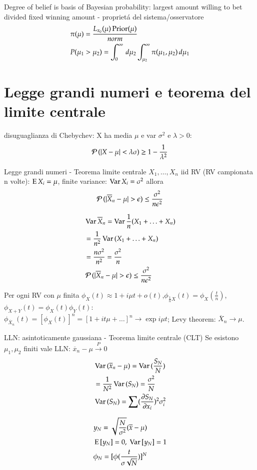 \documentclass[main.tex]{subfiles}
\begin{document}
Degree of belief is basis of Bayesian probability: largest amount willing to bet divided fixed winning amount - propriet\'a del sistema/osservatore
\begin{align*}
&\pi(\mu)=\frac{L_{x_0}(\mu)\prior(\mu)}{norm}\\
&P(\mu_1>\mu_2)=\int_0^{\infty}\,d\mu_2\int_{\mu_2}^{\infty}\pi(\mu_1,\mu_2)\,d\mu_1
\end{align*}

\chapter{Legge grandi numeri e teorema del limite centrale}

disuguaglianza di Chebychev: X ha media $\mu$ e var $\sigma^2$ e $\lambda>0$:
\[\prob{(|X-\mu|<\lambda\sigma)}\geq1-\frac{1}{\lambda^2}\]

Legge grandi numeri - Teorema limite centrale
$X_1,\ldots,X_n$ iid RV (RV campionata n volte): $\E{X_i}=\mu$, finite variance: $\var{X_i}=\sigma^2$ allora \[\prob{(|\overline{X}_n-\mu|>\epsilon)}\leq\frac{\sigma^2}{n\epsilon^2}\]

\begin{align*}
&\var{\overline{X}_n}=\var{\frac{1}{n}(X_1+\ldots+X_n)}\\
&=\frac{1}{n^2}\var{(X_1+\ldots+X_n)}\\
&=\frac{n\sigma^2}{n^2}=\frac{\sigma^2}{n}\\
&\prob{(|\overline{X}_n-\mu|>\epsilon)}\leq\frac{\sigma^2}{n\epsilon^2}
\end{align*}

Per ogni RV con $\mu$ finita $\phi_X(t)\approx1+i\mu t+o(t)$,$\phi_{\frac{1}{n}X}(t)=\phi_X(\frac{t}{n})$, $\phi_{X+Y}(t)=\phi_X(t)\phi_Y(t)$:
$\phi_{\overline{X}_n}(t)=[\phi_X(t)]^n=[1+it\mu+\ldots]^n\to\exp{i\mu t}$; Levy theorem: $\overline{X}_n\to\mu$.

LLN: asintoticamente gaussiana - Teorema limite centrale (CLT)
Se esistono $\mu_1, \mu_2$ finiti vale LLN: $\overline{x}_n-\mu\xrightarrow{P}0$
\begin{align*}
&\var{(\overline{x}_n-\mu)}=\var{(\frac{S_N}{N})}\\
&=\frac{1}{N^2}\var{(S_N)}=\frac{\sigma^2}{N}\\
&\var{(S_N)}=\sum(\PDy{x_i}{S_N})^2\sigma_i^2
\end{align*}

\begin{align*}
&y_N=\sqrt{\frac{N}{\sigma^2}}(\overline{x}-\mu)\\
&\E{[y_N]}=0,\ \var{[y_N]}=1\\
&\phi_N=[\phi(\frac{t}{\sigma\sqrt{N}})]^N
\end{align*}
\end{document}
